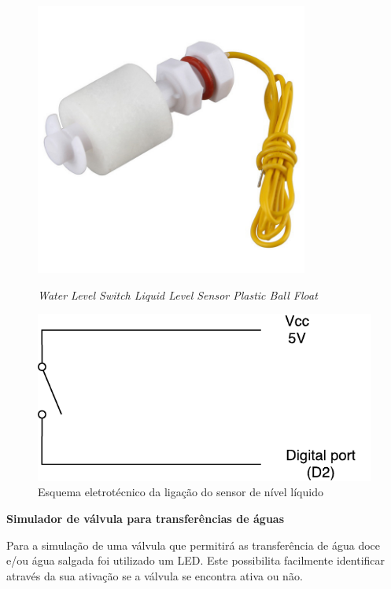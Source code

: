 \begin{figure}[h]
	\centering
	\begin{minipage}[b]{0.4\textwidth}
		\centering
		\includegraphics[width=0.8\textwidth]{img/hardware/liquido.JPG}
		\caption{\textit{Water Level Switch Liquid Level Sensor Plastic Ball Float}}
	\end{minipage}
	\hfill
	\begin{minipage}[b]{0.4\textwidth}
		\centering
		\includegraphics[width=\textwidth]{img/hardware/sw_esquema.pdf}
		\caption{Esquema eletrotécnico da ligação do sensor de nível líquido}
		\label{esquem-liquido}
	\end{minipage}
\end{figure}



\textbf{Simulador de válvula para transferências de águas}

Para a simulação de uma válvula que permitirá as transferência de água doce e/ou água salgada foi utilizado um \ac{LED}. Este possibilita facilmente identificar através da sua ativação se a válvula se encontra ativa ou não. 


